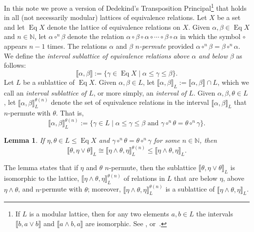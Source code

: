 \documentclass[11pt,reqno]{amsart}
\theoremstyle{plain}
\newtheorem{lemma}{Lemma}
\theoremstyle{definition}
\theoremstyle{remark}
\newtheorem*{remarks}{Remarks}
\newcommand{\<}{\ensuremath{\langle}}
\renewcommand{\>}{\ensuremath{\rangle}}
\newcommand{\lb}{\ensuremath{\llbracket}}
\newcommand{\rb}{\ensuremath{\rrbracket}}
\newcommand{\N}{\ensuremath{\mathbb{N}}}
\renewcommand{\leq}{\ensuremath{\leqslant}}
\newcommand{\meet}{\ensuremath{\wedge}}
\newcommand{\join}{\ensuremath{\vee}}
\newcommand{\Eq}{\ensuremath{\operatorname{Eq}}}
\begin{document}
In this note we prove a version of Dedekind's Transposition
Principal\footnote{If $L$ is a modular lattice, then for any two elements $a, b\in L$
the intervals $\lb b, a\join b\rb$ and $\lb a\meet b, a\rb$ are isomorphic.
 See \cite{Dedekind:1900}, or~\cite[page 57]{alvi:1987}.} that
holds in all (not necessarily modular) lattices of equivalence 
relations.
Let $X$ be a set and let $\Eq X$ denote the lattice of equivalence relations on $X$.  Given $\alpha,
\beta \in \Eq X$ and $n \in \N$, let 
$\alpha \circ^{n} \beta$ denote the relation $\alpha \circ \beta
\circ \alpha \circ \cdots \circ \beta \circ \alpha$ in which the symbol $\circ$ appears $n-1$ times.  
The relations $\alpha$ and $\beta$ \emph{$n$-permute} provided 
$\alpha \circ^{n} \beta = \beta \circ^{n} \alpha$.
We define the
\emph{interval sublattice of equivalence relations above $\alpha$ and below
  $\beta$} %
as follows:
\[
\lb \alpha, \beta\rb:= \{\gamma \in \Eq X \mid \alpha \leq \gamma \leq \beta\}.
\]
Let $L$ be a sublattice of $\Eq X$.  Given $\alpha,
\beta \in L$, let $\lb \alpha, \beta \rb_L:= \lb \alpha, \beta \rb \cap L$,
which we call an \emph{interval sublattice of $L$}, or more simply, an \emph{interval of $L$}.
Given 
$\alpha, \beta, \theta \in L$, let  $\lb \alpha, \beta \rb_L^{\theta(n)}$ denote the
set of equivalence relations in the interval $\lb \alpha, \beta \rb_L$  that $n$-permute with
$\theta$.  That is, 
\[
\lb \alpha, \beta \rb_L^{\theta(n)}:= \{\gamma \in L \mid \alpha \leq \gamma \leq
\beta \text{ and } \gamma \circ^{n} \theta = \theta \circ^{n} \gamma\}.
\]
\begin{lemma}
\label{lem:1}
If $\eta, \theta \in L\leq \Eq X$ and  $\gamma \circ^{n} \theta = \theta
\circ^{n} \gamma$ for some  $n\in \N$, then
\[\lb\theta, \eta \join \theta\rb_L \cong \lb\eta \meet \theta, \eta\rb_L^{\theta(n)} \leq 
\lb\eta \meet \theta, \eta\rb_L.
\]
\end{lemma}
The lemma states that if $\eta$ and $\theta$ $n$-permute, then
the sublattice $\lb\theta, \eta \join \theta\rb_L$ is isomorphic to the lattice,
$\lb\eta \meet \theta, \eta\rb_L^{\theta(n)}$ of relations in $L$ that are below
$\eta$, above $\eta \meet \theta$, and $n$-permute with $\theta$; moreover, $\lb\eta \meet \theta,
\eta\rb_L^{\theta(n)}$ is a sublattice of $\lb\eta \meet \theta, \eta\rb_L$.
\end{document}
